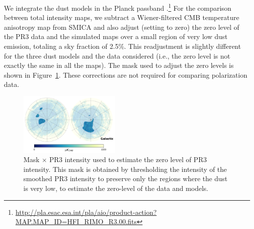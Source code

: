 \documentclass[twocolumn]{aastex631}
\begin{document}
We integrate the dust models in the Planck passband \citep{planck2013-p03d}.\footnote{\url{http://pla.esac.esa.int/pla/aio/product-action?MAP.MAP_ID=HFI_RIMO_R3.00.fits}} For the comparison between total intensity maps, we subtract a Wiener-filtered CMB temperature anisotropy map from SMICA and also adjust (setting to zero) the zero level of the PR3 data and the simulated maps over a small region of very low dust emission, totaling a sky fraction of 2.5\%.
This readjustment is slightly different for the three dust models and the data considered (i.e., the zero level is not exactly the same in all the maps). 
The mask used to adjust the zero levels is shown in Figure~\ref{fig:mask_zero_lvl_int}. 
These corrections are not required for comparing polarization data. 


\begin{figure}[ht!]
    \centering
    \includegraphics[width=0.44\textwidth]{figures/mask_intxPR3_zero_lvl.png}
    \caption{Mask $\times$ PR3 intensity used to estimate the zero level of PR3 intensity. This mask is obtained by thresholding the intensity of the smoothed PR3 intensity to preserve only the regions where the dust is very low, to estimate the zero-level of the data and models.}
    \label{fig:mask_zero_lvl_int}
\end{figure}
\end{document}
